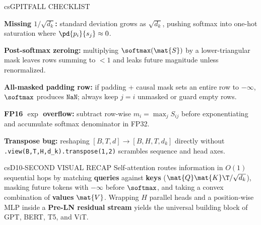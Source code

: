 \documentclass[../../../../master.tex]{subfiles}
\begin{document}
\begin{cscolumns}
\begin{cscard}{csG}{PITFALL CHECKLIST}
  \begin{csbul}
    \item \textbf{Missing $1/\sqrt{d_k}$:} standard deviation grows as $\sqrt{d_k}$, pushing softmax into one-hot saturation where $\pd{p_i}{s_j}\approx 0$.
    \item \textbf{Post-softmax zeroing:} multiplying $\softmax(\mat{S})$ by a lower-triangular mask leaves rows summing to $<1$ and leaks future magnitude unless renormalized.
    \item \textbf{All-masked padding row:} if padding + causal mask sets an entire row to $-\infty$, $\softmax$ produces $\texttt{NaN}$; always keep $j=i$ unmasked or guard empty rows.
    \item \textbf{FP16 $\exp$ overflow:} subtract row-wise $m_i=\max_j S_{ij}$ before exponentiating and accumulate softmax denominator in FP32.
    \item \textbf{Transpose bug:} reshaping $[B,T,d]\to[B,H,T,d_k]$ directly without \texttt{.view(B,T,H,d\_k).transpose(1,2)} scrambles sequence and head axes.
  \end{csbul}
\end{cscard}

\begin{cscard}{csD}{10-SECOND VISUAL RECAP}
  \sffamily\footnotesize
  Self-attention routes information in $O(1)$ sequential hops by matching \textbf{queries} against \textbf{keys} ($\mat{Q}\mat{K}\T/\sqrt{d_k}$), masking future tokens with $-\infty$ before $\softmax$, and taking a convex combination of \textbf{values} $\mat{V}$. Wrapping $H$ parallel heads and a position-wise MLP inside a \textbf{Pre-LN residual stream} yields the universal building block of GPT, BERT, T5, and ViT.
\end{cscard}
\end{cscolumns}

\csend
\end{document}
